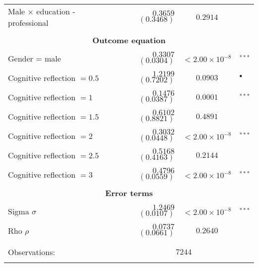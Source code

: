 \documentclass[a4paper,12pt]{article}
\begin{document}
{\begin{threeparttable}
\begin{small}
\begin{tabular}{lrcl}
\\
  \vspace{-0.2cm}Male $\times$ education -  professional&$0.3659$ $(0.3468)$ &$0.2914$&\\
 \\
   \hline  
  \multicolumn{4}{c}{\textbf{Outcome equation}}\\
     \hline
      \\
      \vspace{-0.2cm}Gender = male&$0.3307$ $(0.0304)$&$<2.00\times 10^{-8}$&$^{***}$\\
  \\
\vspace{-0.2cm}Cognitive reflection $=0.5$&$1.2199$ $(0.7202)$&$0.0903$&$^{\bullet}$\\
  \\
\vspace{-0.2cm}Cognitive reflection $=1$&$0.1476$ $(0.0387)$&$0.0001$&$^{***}$\\
  \\
  \vspace{-0.2cm}Cognitive reflection $=1.5$&$0.6102$ $(0.8821)$&$0.4891$\\
   \\
\vspace{-0.2cm}Cognitive reflection $=2$&$0.3032$ $(0.0448)$&$<2.00\times 10^{-8}$&$^{***}$\\
  \\
\vspace{-0.2cm}Cognitive reflection $=2.5$&$0.5168$ $(0.4163)$&$0.2144$&\\
  \\
  \vspace{-0.2cm}Cognitive reflection $=3$&$0.4796$ $(0.0559)$&$<2.00\times 10^{-8}$&$^{***}$\\
  \\ \hline  
  \multicolumn{4}{c}{\textbf{Error terms}}\\
   \hline  
      \\
      \vspace{-0.2cm}Sigma $\sigma$&$1.2469$ $(0.0107)$&$<2.00\times 10^{-8}$&$^{***}$\\
  \\
\vspace{-0.2cm}Rho $\rho$&$0.0737$ $(0.0661)$&$0.2640$&\\
\\
\hline
\vspace{-0.4cm} \\ Observations:&    \multicolumn{3}{c}{$7244$} \\  \vspace{-0.4cm}

\end{tabular}
\end{small}
\end{threeparttable}}
\end{document}
